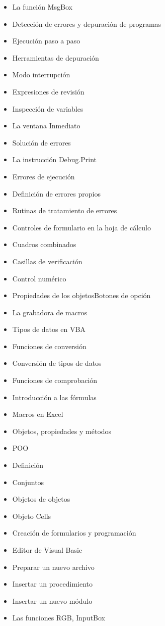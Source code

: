 \begin{itemize}
\item La función MsgBox
\item Detección de errores y depuración de programas
\item Ejecución paso a paso
\item Herramientas de depuración
\item Modo interrupción
\item Expresiones de revisión
\item Inspección de variables
\item La ventana Inmediato
\item Solución de errores
\item La instrucción Debug.Print
\item Errores de ejecución
\item Definición de errores propios
\item Rutinas de tratamiento de errores
\item Controles de formulario en la hoja de cálculo
\item Cuadros combinados
\item Casillas de verificación
\item Control numérico
\item Propiedades de los objetosBotones de opción
\item La grabadora de macros
\item Tipos de datos en VBA
\item Funciones de conversión
\item Conversión de tipos de datos
\item Funciones de comprobación
\item Introducción a las fórmulas
\item Macros en Excel
\item Objetos, propiedades y métodos
\item POO
\item Definición
\item Conjuntos
\item Objetos de objetos
\item Objeto Cells
\item Creación de formularios y programación
\item Editor de Visual Basic
\item Preparar un nuevo archivo
\item Insertar un procedimiento
\item Insertar un nuevo módulo
\item Las funciones RGB, InputBox

\end{itemize}
